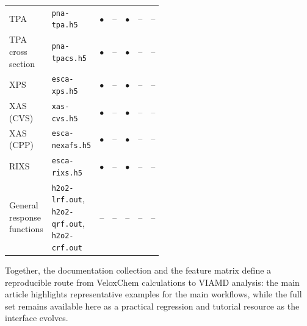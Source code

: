 \documentclass[journal=jacsat,manuscript=suppinfo]{achemso}
\begin{document}
\begin{landscape}
{\begin{longtable}{p{0.25\linewidth}p{0.25\linewidth}ccccc}
TPA & \texttt{pna-tpa.h5} & \(\bullet\) & -- & \(\bullet\) & -- & -- \\
TPA cross section & \texttt{pna-tpacs.h5} & \(\bullet\) & -- & \(\bullet\) & -- & -- \\
XPS & \texttt{esca-xps.h5} & \(\bullet\) & -- & \(\bullet\) & -- & -- \\
XAS (CVS) & \texttt{xas-cvs.h5} & \(\bullet\) & -- & \(\bullet\) & -- & -- \\
XAS (CPP) & \texttt{esca-nexafs.h5} & \(\bullet\) & -- & \(\bullet\) & -- & -- \\
RIXS & \texttt{esca-rixs.h5} & \(\bullet\) & -- & \(\bullet\) & -- & -- \\
General response functions & \texttt{h2o2-lrf.out}, \texttt{h2o2-qrf.out}, \texttt{h2o2-crf.out} & -- & -- & -- & -- & -- \\
\hline
\end{longtable}
}
\end{landscape}

Together, the documentation collection and the feature matrix define a reproducible route from VeloxChem calculations to VIAMD analysis: the main article highlights representative examples for the main workflows, while the full set remains available here as a practical regression and tutorial resource as the interface evolves.


\end{document}
